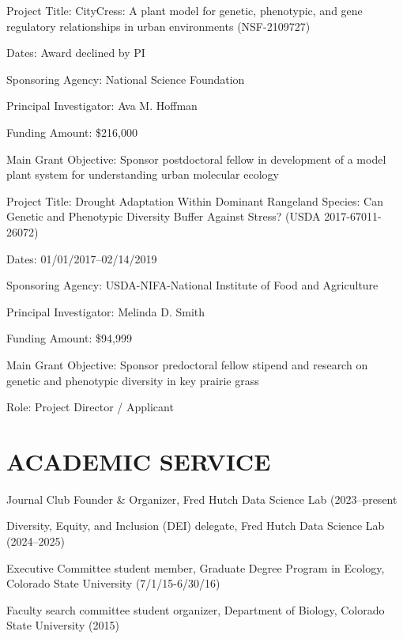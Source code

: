 \documentclass{cv}
\begin{document}
Project Title: CityCress: A plant model for genetic, phenotypic, and gene regulatory relationships in urban environments (NSF-2109727)

Dates: Award declined by PI

Sponsoring Agency: National Science Foundation

Principal Investigator: Ava M. Hoffman

Funding Amount: \$216,000

Main Grant Objective: Sponsor postdoctoral fellow in development of a model plant system for understanding urban molecular ecology

\vspace{5mm}

Project Title: Drought Adaptation Within Dominant Rangeland Species: Can Genetic and Phenotypic Diversity Buffer Against Stress? (USDA 2017-67011-26072)

Dates: 01/01/2017--02/14/2019

Sponsoring Agency: USDA-NIFA-National Institute of Food and Agriculture

Principal Investigator: Melinda D. Smith

Funding Amount: \$94,999

Main Grant Objective: Sponsor predoctoral fellow stipend and research on genetic and phenotypic diversity in key prairie grass

Role: Project Director / Applicant


\section*{ACADEMIC SERVICE}

Journal Club Founder \& Organizer, Fred Hutch Data Science Lab (2023--present

Diversity, Equity, and Inclusion (DEI) delegate, Fred Hutch Data Science Lab (2024--2025)

Executive Committee student member, Graduate Degree Program in Ecology, Colorado State University (7/1/15-6/30/16)

Faculty search committee student organizer, Department of Biology, Colorado State University (2015)

\end{document}
